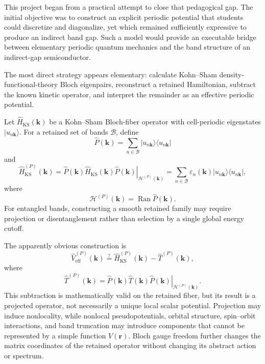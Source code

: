 This project began from a practical attempt to close that pedagogical gap. The
initial objective was to construct an explicit periodic potential that students
could discretize and diagonalize, yet which remained sufficiently expressive
to produce an indirect band gap. Such a model would provide an executable
bridge between elementary periodic quantum mechanics and the band structure of
an indirect-gap semiconductor.

The most direct strategy appears elementary: calculate Kohn--Sham
density-functional-theory Bloch eigenpairs, reconstruct a retained Hamiltonian,
subtract the known kinetic operator, and interpret the remainder as an
effective periodic potential.

Let $\hat H_{\mathrm{KS}}(\mathbf k)$ be a Kohn--Sham Bloch-fiber operator
with cell-periodic eigenstates $\lvert u_{n\mathbf k}\rangle$. For a retained
set of bands $\mathcal B$, define
\begin{equation}
    \hat P(\mathbf k)
    =
    \sum_{n\in\mathcal B}
    \lvert u_{n\mathbf k}\rangle
    \langle u_{n\mathbf k}\rvert
\end{equation}
and
\begin{equation}
    \hat H_{\mathrm{KS}}^{(P)}(\mathbf k)
    =
    \left.
        \hat P(\mathbf k)
        \hat H_{\mathrm{KS}}(\mathbf k)
        \hat P(\mathbf k)
    \right|_{\mathcal H^{(P)}(\mathbf k)}
    =
    \sum_{n\in\mathcal B}
    \varepsilon_n(\mathbf k)
    \lvert u_{n\mathbf k}\rangle
    \langle u_{n\mathbf k}\rvert,
\end{equation}
where
\begin{equation}
    \mathcal H^{(P)}(\mathbf k)
    =
    \operatorname{Ran}\hat P(\mathbf k).
\end{equation}
For entangled bands, constructing a smooth retained family may require
projection or disentanglement rather than selection by a single global energy
cutoff.

The apparently obvious construction is
\begin{equation}
    \hat V_{\mathrm{eff}}^{(P)}(\mathbf k)
    \stackrel{?}{=}
    \hat H_{\mathrm{KS}}^{(P)}(\mathbf k)
    -
    \hat T^{(P)}(\mathbf k),
\end{equation}
where
\begin{equation}
    \hat T^{(P)}(\mathbf k)
    =
    \left.
        \hat P(\mathbf k)
        \hat T(\mathbf k)
        \hat P(\mathbf k)
    \right|_{\mathcal H^{(P)}(\mathbf k)}.
\end{equation}
This subtraction is mathematically valid on the retained fiber, but its result
is a projected operator, not necessarily a unique local scalar potential.
Projection may induce nonlocality, while nonlocal pseudopotentials, orbital
structure, spin--orbit interactions, and band truncation may introduce
components that cannot be represented by a simple function $V(\mathbf r)$.
Bloch gauge freedom further changes the matrix coordinates of the retained
operator without changing its abstract action or spectrum.

